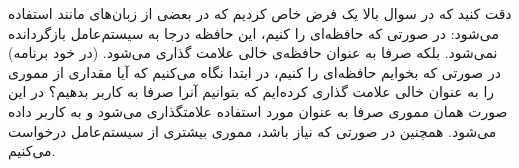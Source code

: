 دقت کنید که در سوال بالا یک فرض خاص کردیم که در بعضی از زبان‌های
مانند
استفاده می‌شود:
در صورتی که حافظه‌ای را
کنیم، این حافظه درجا به سیستم‌عامل بازگردانده نمی‌شود. بلکه صرفا
به عنوان حافظه‌ی خالی علامت گذاری می‌شود. (در خود برنامه) در صورتی که بخوایم حافظه‌ای را
کنیم، در ابتدا نگاه می‌کنیم که آیا مقداری از مموری را به عنوان خالی علامت گذاری کرده‌ایم
که بتوانیم آنرا صرفا به کاربر بدهیم؟ در این صورت همان مموری صرفا به عنوان مورد استفاده
علامتگذاری می‌شود و به کاربر داده می‌شود. همچنین در صورتی که نیاز باشد، مموری بیشتری از
سیستم‌عامل درخواست می‌کنیم.

